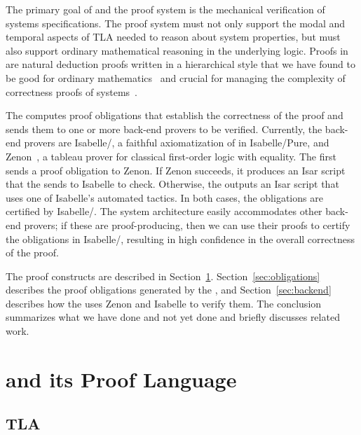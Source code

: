 \documentclass[a4paper]{easychair}
\begin{document}
The primary goal of \tlatwo and the proof system is the mechanical
verification of systems specifications. The proof system must not only
support the modal and temporal aspects of TLA needed
to reason about system properties, but must also support
ordinary mathematical reasoning in the underlying logic. Proofs in
\tlatwo are natural deduction proofs written in a hierarchical style
that we have found to be good for ordinary
mathematics~\cite{lamport93amm} and crucial for managing the
complexity of correctness proofs of systems~\cite{gafni:disk-paxos}.

The \PM computes proof obligations that establish the correctness of
the proof and sends them to one or more back-end provers to be
verified.  Currently, the back-end provers are Isabelle/\tlaplus, a
faithful axiomatization of \tlaplus in Isabelle/Pure, and
Zenon~\cite{bonichon07lpar}, a tableau prover for classical
first-order logic with equality.  The \PM first sends a proof
obligation to Zenon.  If Zenon succeeds, it produces an Isar script
that the \PM sends to Isabelle to check.
Otherwise, the \PM outputs an Isar script that uses one of Isabelle's
automated tactics.
In both cases, the obligations are certified by Isabelle/\tlaplus.
The system architecture easily accommodates other back-end provers; if
these are proof-producing, then we can use their proofs to certify the
obligations in Isabelle/\tlaplus, resulting in high confidence in the
overall correctness of the proof.

The \tlatwo proof constructs are described in
Section~\ref{sec:proof-language}.  Section~\ref{sec:obligations}
describes the proof obligations generated by the \PM, and
Section~\ref{sec:backend} describes how the \PM uses Zenon and
Isabelle to verify them.  The conclusion summarizes what we have done
and not yet done and briefly discusses related work.

\section{\tlaplus and its Proof Language}
\label{sec:proof-language}

\subsection{TLA}
\label{sec:proof-language.tla} 
\end{document}
